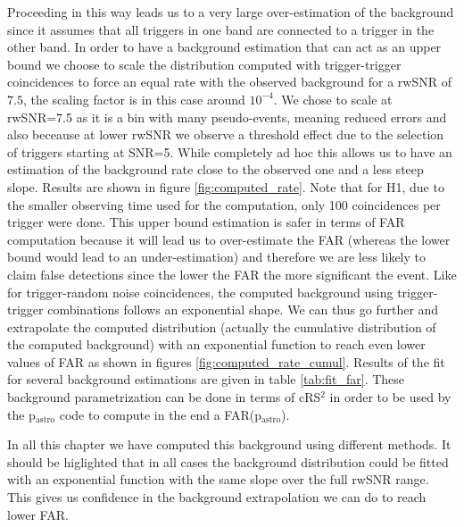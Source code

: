 Proceeding in this way leads us to a very large over-estimation of the background since it assumes that all triggers in one band are connected to a trigger in the other band.
In order to have a background estimation that can act as an upper bound we choose to scale the distribution computed with trigger-trigger coincidences to force an equal rate with the observed background for a rwSNR of $7.5$, the scaling factor is in this case around $10^{-4}$.
We chose to scale at rwSNR=7.5 as it is a bin with many pseudo-events, meaning reduced errors and also beceause at lower rwSNR we observe a threshold effect due to the selection of triggers starting at SNR=5.
While completely ad hoc this allows us to have an estimation of the background rate close to the observed one and a less steep slope.
Results are shown in figure \ref{fig:computed_rate}.
Note that for H1, due to the smaller observing time used for the computation, only 100 coincidences per trigger were done.
This upper bound estimation is safer in terms of FAR computation because it will lead us to over-estimate the FAR (whereas the lower bound would lead to an under-estimation) and therefore we are less likely to claim false detections since the lower the FAR the more significant the event.
Like for trigger-random noise coincidences, the computed background using trigger-trigger combinations follows an exponential shape.
We can thus go further and extrapolate the computed distribution (actually the cumulative distribution of the computed background) with an exponential function to reach even lower values of FAR as shown in figures \ref{fig:computed_rate_cumul}. Results of the fit for several background estimations are given in table \ref{tab:fit_far}.
These background parametrization can be done in terms of cRS$^2$ in order to be used by the p$_{\textrm{astro}}$ code to compute in the end a FAR(p$_{\textrm{astro}}$).

In all this chapter we have computed this background using different methods.
It should be higlighted that in all cases the background distribution could be fitted with an exponential function with the same slope over the full rwSNR range.
This gives us confidence in the background extrapolation we can do to reach lower FAR.

